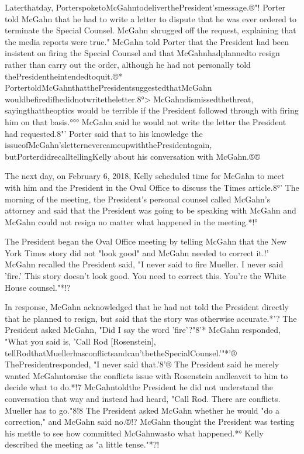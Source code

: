 Laterthatday, PorterspoketoMcGahntodeliverthePresident'smessage.®"!
Porter told McGahn that he had to write a letter to dispute that he was ever ordered to terminate the Special Counsel.
McGahn shrugged off the request, explaining that the media reports were true."
McGahn told Porter that the President had been insistent on firing the Special Counsel and that McGahnhadplannedto resign rather than carry out the order, although he had not personally told thePresidentheintendedtoquit.®*
PortertoldMcGahnthatthePresidentsuggestedthatMcGahn wouldbefiredifhedidnotwritetheletter.8°>
McGahndismissedthethreat, sayingthattheoptics would be terrible if the President followed through with firing him on that basis.°°°
McGahn said he would not write the letter the President had requested.8"'
Porter said that to his knowledge the
issueofMcGahn'sletternevercameupwiththePresidentagain, butPorterdidrecalltellingKelly about his conversation with McGahn.®®

The next day, on February 6, 2018, Kelly scheduled time for McGahn to meet with him and the President in the Oval Office to discuss the Times article.8°'
The morning of the meeting, the President's personal counsel called McGahn's attorney and said that the President was going to be speaking with McGahn and McGahn could not resign no matter what happened in the meeting.*!°

The President began the Oval Office meeting by telling McGahn that the New York Times story did not "look good" and McGahn needed to correct it.!'
McGahn recalled the President said, "I never said to fire Mueller.
I never said 'fire.'
This story doesn't look good.
You need to correct this.
You're the White House counsel."*!?

In response, McGahn acknowledged that he had not told the President directly that he planned to resign, but said that the story was otherwise accurate.*'?
The President asked McGahn, "Did I say the word 'fire'?"8'*
McGahn responded, "What you said is, 'Call Rod [Rosenstein], tellRodthatMuellerhasconflictsandcan'tbetheSpecialCounsel.'"*'®
ThePresidentresponded, "I never said that.'8'®
The President said he merely wanted McGahntoraise the conflicts issue with Rosenstein andleaveit to him to decide what to do.*!7
McGahntoldthe President he did not understand the conversation that way and instead had heard, "Call Rod.
There are conflicts.
Mueller has to go."8!8
The President asked McGahn whether he would "do a correction," and McGahn said no.®!?
McGahn thought the President was testing his mettle to see how committed McGahnwasto what happened.*°
Kelly described the meeting as "a little tense."*?!

